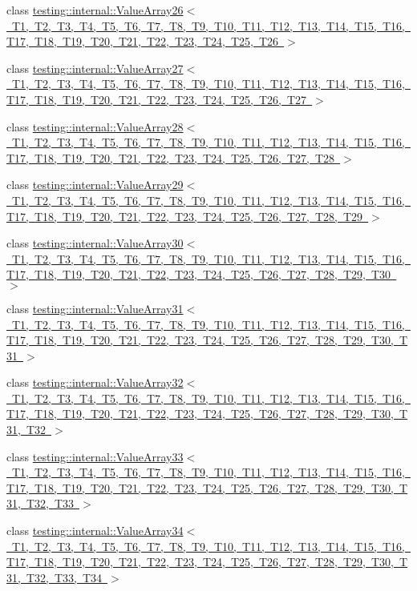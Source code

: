 \begin{DoxyCompactItemize}
\item 
class \mbox{\hyperlink{classtesting_1_1internal_1_1ValueArray26}{testing\+::internal\+::\+Value\+Array26$<$ T1, T2, T3, T4, T5, T6, T7, T8, T9, T10, T11, T12, T13, T14, T15, T16, T17, T18, T19, T20, T21, T22, T23, T24, T25, T26 $>$}}
\item 
class \mbox{\hyperlink{classtesting_1_1internal_1_1ValueArray27}{testing\+::internal\+::\+Value\+Array27$<$ T1, T2, T3, T4, T5, T6, T7, T8, T9, T10, T11, T12, T13, T14, T15, T16, T17, T18, T19, T20, T21, T22, T23, T24, T25, T26, T27 $>$}}
\item 
class \mbox{\hyperlink{classtesting_1_1internal_1_1ValueArray28}{testing\+::internal\+::\+Value\+Array28$<$ T1, T2, T3, T4, T5, T6, T7, T8, T9, T10, T11, T12, T13, T14, T15, T16, T17, T18, T19, T20, T21, T22, T23, T24, T25, T26, T27, T28 $>$}}
\item 
class \mbox{\hyperlink{classtesting_1_1internal_1_1ValueArray29}{testing\+::internal\+::\+Value\+Array29$<$ T1, T2, T3, T4, T5, T6, T7, T8, T9, T10, T11, T12, T13, T14, T15, T16, T17, T18, T19, T20, T21, T22, T23, T24, T25, T26, T27, T28, T29 $>$}}
\item 
class \mbox{\hyperlink{classtesting_1_1internal_1_1ValueArray30}{testing\+::internal\+::\+Value\+Array30$<$ T1, T2, T3, T4, T5, T6, T7, T8, T9, T10, T11, T12, T13, T14, T15, T16, T17, T18, T19, T20, T21, T22, T23, T24, T25, T26, T27, T28, T29, T30 $>$}}
\item 
class \mbox{\hyperlink{classtesting_1_1internal_1_1ValueArray31}{testing\+::internal\+::\+Value\+Array31$<$ T1, T2, T3, T4, T5, T6, T7, T8, T9, T10, T11, T12, T13, T14, T15, T16, T17, T18, T19, T20, T21, T22, T23, T24, T25, T26, T27, T28, T29, T30, T31 $>$}}
\item 
class \mbox{\hyperlink{classtesting_1_1internal_1_1ValueArray32}{testing\+::internal\+::\+Value\+Array32$<$ T1, T2, T3, T4, T5, T6, T7, T8, T9, T10, T11, T12, T13, T14, T15, T16, T17, T18, T19, T20, T21, T22, T23, T24, T25, T26, T27, T28, T29, T30, T31, T32 $>$}}
\item 
class \mbox{\hyperlink{classtesting_1_1internal_1_1ValueArray33}{testing\+::internal\+::\+Value\+Array33$<$ T1, T2, T3, T4, T5, T6, T7, T8, T9, T10, T11, T12, T13, T14, T15, T16, T17, T18, T19, T20, T21, T22, T23, T24, T25, T26, T27, T28, T29, T30, T31, T32, T33 $>$}}
\item 
class \mbox{\hyperlink{classtesting_1_1internal_1_1ValueArray34}{testing\+::internal\+::\+Value\+Array34$<$ T1, T2, T3, T4, T5, T6, T7, T8, T9, T10, T11, T12, T13, T14, T15, T16, T17, T18, T19, T20, T21, T22, T23, T24, T25, T26, T27, T28, T29, T30, T31, T32, T33, T34 $>$}}

\end{DoxyCompactItemize}
